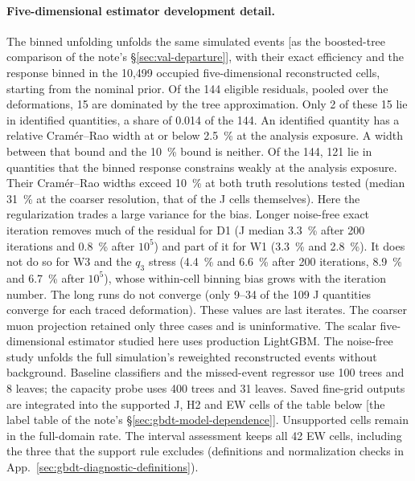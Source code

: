 \paragraph{Five-dimensional estimator development detail.} The binned unfolding unfolds the same simulated events [as the boosted-tree comparison of the note's \S\ref{sec:val-departure}], with their exact efficiency and the response binned in the 10,499 occupied five-dimensional reconstructed cells, starting from the nominal prior. Of the 144 eligible residuals, pooled over the deformations, 15 are dominated by the tree approximation. Only 2 of these 15 lie in identified quantities, a share of 0.014 of the 144. An identified quantity has a relative Cram\'er--Rao width at or below \SI{2.5}{\percent} at the analysis exposure. A width between that bound and the \SI{10}{\percent} bound is neither. Of the 144, 121 lie in quantities that the binned response constrains weakly at the analysis exposure. Their Cram\'er--Rao widths exceed \SI{10}{\percent} at both truth resolutions tested (median \SI{31}{\percent} at the coarser resolution, that of the J cells themselves). Here the regularization trades a large variance for the bias. Longer noise-free exact iteration removes much of the residual for D1 (J median \SI{3.3}{\percent} after 200 iterations and \SI{0.8}{\percent} after $10^{5}$) and part of it for W1 (\SI{3.3}{\percent} and \SI{2.8}{\percent}). It does not do so for W3 and the $q_3$ stress (\SI{4.4}{\percent} and \SI{6.6}{\percent} after 200 iterations, \SI{8.9}{\percent} and \SI{6.7}{\percent} after $10^{5}$), whose within-cell binning bias grows with the iteration number. The long runs do not converge (only 9--34 of the 109 J quantities converge for each traced deformation). These values are last iterates. The coarser muon projection retained only three cases and is uninformative. The scalar five-dimensional estimator studied here uses production LightGBM. The noise-free study unfolds the full simulation's reweighted reconstructed events without background. Baseline classifiers and the missed-event regressor use 100 trees and 8 leaves; the capacity probe uses 400 trees and 31 leaves. Saved fine-grid outputs are integrated into the supported J, H2 and EW cells of the table below [the label table of the note's \S\ref{sec:gbdt-model-dependence}]. Unsupported cells remain in the full-domain rate. The interval assessment keeps all 42 EW cells, including the three that the support rule excludes (definitions and normalization checks in App.~\ref{sec:gbdt-diagnostic-definitions}).


